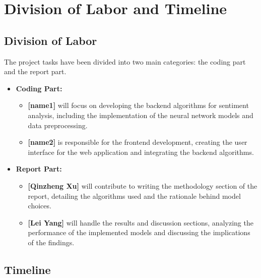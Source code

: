 \documentclass[11pt,a4paper]{article}
\begin{document}
\section{Division of Labor and Timeline}

\subsection{Division of Labor}

The project tasks have been divided into two main categories: the coding part and the report part. 

\begin{itemize}
    \item \textbf{Coding Part:}
    \begin{itemize}
        \item \textbf{[name1]} will focus on developing the backend algorithms for sentiment analysis, including the implementation of the neural network models and data preprocessing.
        \item \textbf{[name2]} is responsible for the frontend development, creating the user interface for the web application and integrating the backend algorithms.
    \end{itemize}
    
    \item \textbf{Report Part:}
    \begin{itemize}
        \item \textbf{[Qinzheng Xu]} will contribute to writing the methodology section of the report, detailing the algorithms used and the rationale behind model choices.
        \item \textbf{[Lei Yang]} will handle the results and discussion sections, analyzing the performance of the implemented models and discussing the implications of the findings.
    \end{itemize}
\end{itemize}

\subsection{Timeline}
\end{document}
